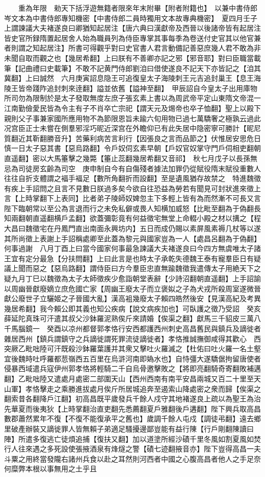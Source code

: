 　　重為年限　勑天下括浮遊無籍者限來年末附畢【附者附籍也】　以兼中書侍郎岑文本為中書侍郎專知機密【中書侍郎二員時獨用文本故專典機密】　夏四月壬子上謂諫議大夫褚遂良曰卿猶知起居注【唐六典曰漢獻帝及西晉以後諸帝皆有起居注皆史官所録隋置起居舍人始為職員列為侍臣專掌其事每季為卷送付史官其以他官兼者則謂之知起居注】所書可得觀乎對曰史官書人君言動備記善惡庶幾人君不敢為非未聞自取而觀之也【幾居希翻】上曰朕有不善卿亦記之邪【邪音耶】對曰臣職當載筆【記曲禮曰史載筆】不敢不記黄門侍郎劉洎曰借使遂良不記天下亦皆記之【洎其冀翻】上曰誠然　六月庚寅詔息隐王可追復皇太子海陵刺王元吉追封巢王【息王海陵王皆帝踐阼追封刺來逹翻】謚並依舊【謚神至翻】　甲辰詔自今皇太子出用庫物所司勿為限制於是太子發取無度左庶子張玄素上書以為周武帝平定山東隋文帝混一江南勤儉愛民皆為令主有子不肖卒亡宗祀【謂天元及焬帝也卒子恤翻】聖上以殿下親則父子事兼家國所應用物不為節限恩旨未踰六旬用物已過七萬驕奢之極孰云過此况宫臣正士未嘗在側羣邪淫巧昵近深宫在外瞻仰已有此失居中隐密寧可勝計【昵尼質翻近其靳翻勝音升】苦藥利病苦言利行【因張良之言而品節之】伏惟居安思危日慎一日太子惡其書【惡烏路翻】令戶奴伺玄素早朝【戶奴官奴掌守門戶伺相吏翻朝直遥翻】密以大馬箠擊之幾斃【箠止蕊翻幾居希翻又音祁】　秋七月戊子以長孫無忌為司徒房玄齡為司空　庚申制自今有自傷殘者據法加罪仍從賦役隋末賦役重數人往往自折支體謂之褔手褔足【數所角翻折而設翻】至是遺風猶存故禁之　特進魏徵有疾上手詔問之且言不見數日朕過多矣今欲自往恐益為勞若有聞見可封狀進來徵上言【上時掌翻下上表同】比者弟子陵師奴婢忽主下多輕上皆有為而然漸不可長又言陛下臨朝常以至公為言退而行之未免私僻或畏人知横加威怒【比毗至翻為于偽翻長知兩翻朝直遥翻横戶孟翻】欲蓋彌彰竟有何益徵宅無堂上命輟小殿之材以搆之【程大昌曰魏徵宅在丹鳳門直出南面永興坊内】五日而成仍賜以素屏風素褥几杖等以遂其所尚徵上表謝上手詔稱處卿至此蓋為黎元與國家豈為一人【處昌呂翻為于偽翻】何事過謝　八月丁酉上曰當今國家何事最急諫議大夫褚遂良曰今四方無虞唯太子諸王宜有定分最急【分扶問翻】上曰此言是也時太子承乾失德魏王泰有寵羣臣日有疑議上聞而惡之【惡烏路翻】謂侍臣曰方今羣臣忠直無踰魏徵我遣傳太子用絶天下之疑九月丁巳以魏徵為太子太師徵疾少愈詣朝堂表辭【少詩沼翻朝直遥翻】上手詔諭以周幽晉獻廢嫡立庶危國亡家【周幽王廢太子而立褒姒之子為犬戎所殺周室遂微晉獻公廢世子立驪姬之子晉國大亂】漢高袓幾廢太子賴四皓然後安【見漢高紀及考異幾居希翻】我今賴公即其義也知公疾病【說文病疾加也】可臥護之徵乃受詔　癸亥薛延陀真珠可汗遣其叔父沙鉢羅泥熟俟斤來請婚【俟渠之翻】獻馬三千貂皮三萬八千馬腦鏡一　癸酉以凉州都督郭孝恪行安西都護西州刺史高昌舊民與鎮兵及謫徙者雜居西州【鎮兵謂鎮守之兵謫徙謂死罪流徒謫徙者】孝恪推誠撫御咸得其歡心　西突厥乙毗咄陸可汗既殺沙鉢羅葉護并其衆又擊吐火羅滅之【杜佑曰吐火羅一名土壑宜後魏時吐呼羅都䓤嶺西五百里在烏滸河南即媯水也】自恃彊大遂驕倨拘留唐使者侵暴西域遣兵寇伊州郭孝恪將輕騎二千自烏骨邀擊敗之【將即亮翻騎奇寄翻敗補邁翻】乙毗咄陸又遣處月處密二部圍天山【西州西南有南平安昌兩城又百二十里至天山軍】孝恪擊走之乘勝進拔處月俟斤所居城追奔至遏索山降處密之衆而歸【俟渠之翻索昔各翻降戶江翻】初高昌既平歲發兵千餘人戍守其地褚遂良上疏以為聖王為治先華夏而後夷狄【上時掌翻治直吏翻先悉薦翻夏戶雅翻後戶遘翻】陛下興兵取高昌數郡蕭然累年不復【不復不能復承平之舊也】歲調千餘人屯戍【調徒弔翻】遠去鄉里破產辦裝又謫徙罪人皆無賴子弟適足騷擾邊鄙豈能有益行陳【行戶剛翻陳讀曰陣】所遣多復逃亡徒煩追捕【復扶又翻】加以道塗所經沙磧千里冬風如割夏風如焚行人往來遇之多死設使張掖酒泉有烽燧之警【磧七迹翻掖音亦】陛下豈得高昌一夫斗粟之用終當發隴右諸州兵食以赴之耳然則河西者中國之心腹高昌者他人之手足奈何糜弊本根以事無用之土乎且